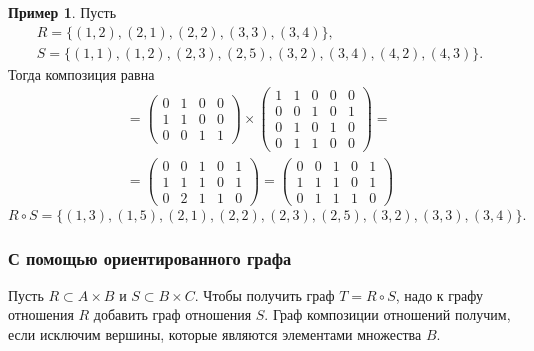 \documentclass[a5paper, 11pt]{extarticle}
\theoremstyle{definition}
\newtheorem*{example*}{Пример}
\theoremstyle{definition}
\theoremstyle{definition}
\numberwithin{figure}{section}
\numberwithin{table}{section}
\begin{document}
\begin{example*}
    Пусть
    \begin{gather*}
        R = \{(1, 2), (2, 1), (2, 2), (3, 3), (3, 4)\},
        \\
        S = \{(1, 1), (1, 2), (2, 3), (2, 5), (3, 2), (3, 4), (4, 2), (4, 3)\}.
    \end{gather*}
    Тогда композиция равна
    \begin{gather*}
        [R \circ S] =
        \begin{pmatrix}
            0 & 1 & 0 & 0 \\
            1 & 1 & 0 & 0 \\
            0 & 0 & 1 & 1
        \end{pmatrix}
        \times
        \begin{pmatrix}
            1 & 1 & 0 & 0 & 0 \\
            0 & 0 & 1 & 0 & 1 \\
            0 & 1 & 0 & 1 & 0 \\
            0 & 1 & 1 & 0 & 0
        \end{pmatrix}
        = \\ =
        \begin{pmatrix}
            0 & 0 & 1 & 0 & 1 \\
            1 & 1 & 1 & 0 & 1 \\
            0 & 2 & 1 & 1 & 0
        \end{pmatrix}
        =
        \begin{pmatrix}
            0 & 0 & 1 & 0 & 1 \\
            1 & 1 & 1 & 0 & 1 \\
            0 & 1 & 1 & 1 & 0
        \end{pmatrix}
    \end{gather*}
    \[
        R \circ S = \{(1, 3), (1, 5), (2, 1), (2, 2), (2, 3), (2, 5), (3, 2), (3, 3), (3, 4)\}.
    \]
\end{example*}

\subsubsection{С помощью ориентированного графа}

Пусть \(R \subset A \times B\) и \(S \subset B \times C\). Чтобы получить граф \(T = R \circ S\), надо к графу отношения \(R\) добавить граф отношения \(S\). Граф композиции отношений получим, если исключим вершины, которые являются элементами множества \(B\).
\end{document}
